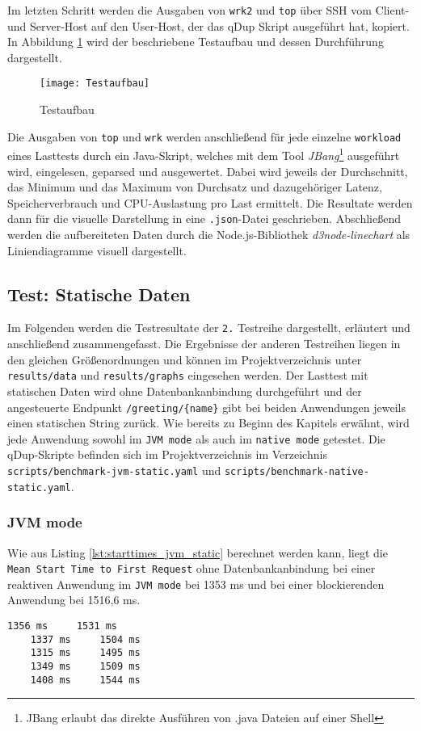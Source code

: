 Im letzten Schritt werden die Ausgaben von \verb|wrk2| und \verb|top| über SSH vom Client- und Server-Host auf den User-Host,
der das qDup Skript ausgeführt hat, kopiert.
In Abbildung \ref{fig:testaufbau} wird der beschriebene Testaufbau und dessen Durchführung dargestellt.
\begin{figure}[ht]
  \centering
  \texttt{[image: Testaufbau]}
  \caption{Testaufbau}
  \label{fig:testaufbau}
\end{figure}

Die Ausgaben von \verb|top| und \verb|wrk| werden anschließend für jede einzelne \verb|workload| eines Lasttests durch ein Java-Skript, welches mit
dem Tool \textit{JBang}\footnote{JBang erlaubt das direkte Ausführen von .java Dateien auf einer Shell} ausgeführt wird, eingelesen, geparsed und ausgewertet.
Dabei wird jeweils der Durchschnitt, das Minimum und das Maximum von Durchsatz und dazugehöriger Latenz, Speicherverbrauch und CPU-Auslastung pro Last ermittelt.
Die Resultate werden dann für die visuelle Darstellung in eine \verb|.json|-Datei geschrieben.
Abschließend werden die aufbereiteten Daten durch die Node.js-Bibliothek \textit{d3node-linechart} als Liniendiagramme visuell dargestellt.

\subsection{Test: Statische Daten}
\label{subsection:statische_daten}
Im Folgenden werden die Testresultate der \verb|2.| Testreihe dargestellt, erläutert und anschließend zusammengefasst.
Die Ergebnisse der anderen Testreihen liegen in den gleichen Größenordnungen und können im Projektverzeichnis unter \verb|results/data| und \verb|results/graphs| eingesehen werden.
Der Lasttest mit statischen Daten wird ohne Datenbankanbindung durchgeführt und der angesteuerte Endpunkt \verb|/greeting/{name}| gibt bei beiden Anwendungen
jeweils einen statischen String zurück. Wie bereits zu Beginn des Kapitels erwähnt, wird jede Anwendung sowohl im \verb|JVM mode| als auch im
\verb|native mode| getestet.
Die qDup-Skripte befinden sich im Projektverzeichnis im Verzeichnis \verb|scripts/benchmark-jvm-static.yaml| und
\verb|scripts/benchmark-native-static.yaml|.

\subsubsection{JVM mode}
\label{subsubsec:static_jvm_mode}
Wie aus Listing \ref{lst:starttimes_jvm_static} berechnet werden kann, liegt die \verb|Mean Start Time to First Request|
ohne Datenbankanbindung bei einer reaktiven Anwendung im \verb|JVM mode| bei 1353 ms und bei einer
blockierenden Anwendung bei 1516,6 ms.
\begin{lstlisting}[caption=Startzeiten im JVM mode mit statischen Ressourcen, captionpos=b, label=lst:starttimes_jvm_static]
    1356 ms     1531 ms
    1337 ms     1504 ms
    1315 ms     1495 ms
    1349 ms     1509 ms
    1408 ms     1544 ms
\end{lstlisting}

